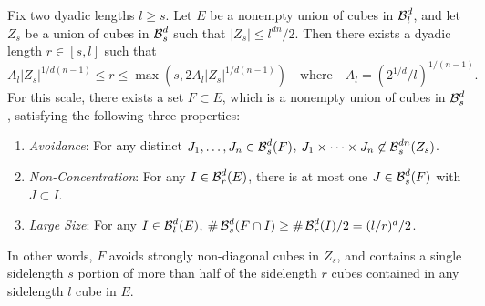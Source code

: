 \begin{lemma} \label{discretelemma}
	Fix two dyadic lengths $l \geq s$. Let $E$ be a nonempty union of cubes in $\operatorname{\mathcal{B}}^d_l$, and let $Z_s$ be a union of cubes in $\operatorname{\mathcal{B}}^d_s$ such that $|Z_s| \leq l^{dn}/2$. Then there exists a dyadic length $r \in [s,l]$ such that
	\begin{equation} \label{rBound}
		A_l |Z_s|^{1/d(n-1)} \leq r \leq \max(s, 2 A_l |Z_s|^{1/d(n-1)})\quad \text{where}\quad A_l = (2^{1/d}/l)^{1/(n-1)}.
	\end{equation}
	For this scale, there exists a set $F \subset E$, which is a nonempty union of cubes in $\operatorname{\mathcal{B}}^d_s$, satisfying the following three properties:
	\begin{enumerate}
		\item\label{avoidanceItem} \emph{Avoidance}: For any distinct $J_1, \dots, J_n \in \operatorname{\mathcal{B}}^d_s(F)$, $J_1 \times \dots \times J_n \not \in \operatorname{\mathcal{B}}_s^{dn}(Z_s)$.
		\item\label{nonConcentrationItem} \emph{Non-Concentration}: For any $I \in \operatorname{\mathcal{B}}_r^d(E)$, there is at most one $J \in \operatorname{\mathcal{B}}_s^d(F)$ with $J \subset I$.
		\item\label{largeSizeItem} \emph{Large Size}: For any $I \in \operatorname{\mathcal{B}}^d_l(E)$, $\# \operatorname{\mathcal{B}}^d_s(F \cap I) \geq \# \operatorname{\mathcal{B}}^d_r(I) / 2 = (l/r)^d / 2$.
	\end{enumerate}
	In other words, $F$ avoids strongly non-diagonal cubes in $Z_s$, and contains a single sidelength $s$ portion of more than half of the sidelength $r$ cubes contained in any sidelength $l$ cube in $E$.
\end{lemma}
